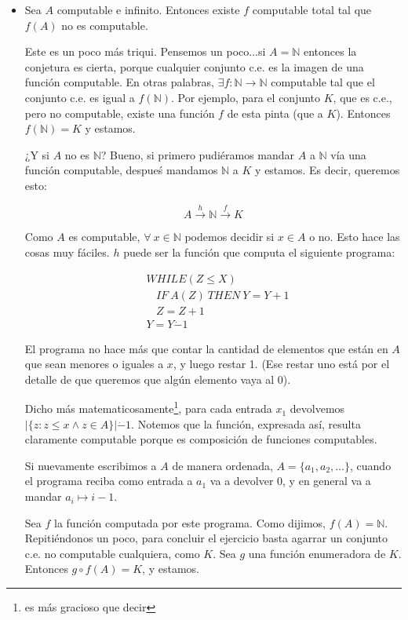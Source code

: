 \documentclass[10pt,a4paper]{article}
\def\key#1{\{#1\}}
\def\N{\mathbb{N}}
\begin{document}
\begin{itemize}
	\item Sea $A$ computable e infinito. Entonces existe $f$ computable total tal que $f(A)$ no es computable.
	
	Este es un poco más triqui. Pensemos un poco...si $A = \N$ entonces la conjetura es cierta, porque cualquier conjunto c.e. es la imagen de una función computable. En otras palabras, $\exists f:\N \to \N$ computable tal que el conjunto c.e. es igual a $f(\N)$. Por ejemplo, para el conjunto $K$, que es c.e., pero no computable, existe una función $f$ de esta pinta (que  a $K$). Entonces $f(\N) = K$ y estamos.
	
	¿Y si $A$ no es $\N$? Bueno, si primero pudiéramos mandar $A$ a $\N$ vía una función computable, despueś mandamos $\N$ a $K$ y estamos. Es decir, queremos esto:
	
	$$A \overset{h}{\longrightarrow} \N \overset{f}{\longrightarrow} K$$
	
	Como $A$ es computable, $\forall\ x\in \N$ podemos decidir si $x\in A$ o no. Esto hace las cosas muy fáciles. $h$ puede ser la función que computa el siguiente programa:
	
	
	\begin{align*}
	&WHILE (Z \leq X)\\
	&\ \ \ \ IF\ A(Z)\ THEN\ Y = Y+1\\
	&\ \ \ \ Z = Z + 1\\
	&Y=Y \dot{-} 1
	\end{align*}

El programa no hace más que contar la cantidad de elementos que están en $A$ que sean menores o iguales a $x$, y luego restar 1. (Ese restar uno está por el detalle de que queremos que algún elemento vaya al 0).

Dicho más matematicosamente\footnote{es más gracioso que decir }, para cada entrada $x_1$ devolvemos $|\key{z : z \leq x \land z \in A}| \dot{-} 1$.  Notemos que la función, expresada así, resulta claramente computable porque es composición de funciones computables.


Si nuevamente escribimos a $A$ de manera ordenada, $A = \key{a_1, a_2, \dots}$, cuando el programa reciba como entrada a $a_1$ va a devolver $0$, y en general va a mandar $a_i \mapsto i-1$.

Sea $f$ la función computada por este programa. Como dijimos, $f(A) = \N$. Repitiéndonos un poco, para concluir el ejercicio basta agarrar un conjunto c.e. no computable cualquiera, como $K$. Sea $g$ una función enumeradora de $K$. Entonces $g\circ f(A) = K$, y estamos.
	
\end{itemize}
\end{document}
